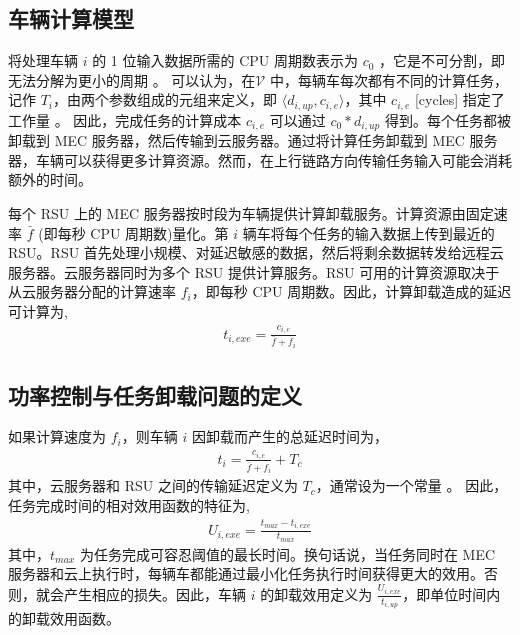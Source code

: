 \subsection{车辆计算模型}\label{section3-2-2}
将处理车辆 $i$ 的 1 位输入数据所需的 CPU 周期数表示为 $c_0$ ，它是不可分割，即无法分解为更小的周期 \supercite{Zhang2017,Saleem2021}。
可以认为，在$ \mathcal{V}$ 中，每辆车每次都有不同的计算任务，记作 $T_i$，由两个参数组成的元组来定义，即 $\langle d_{i,up}, c_{i,e}\rangle$，其中 $c_{i,e}$ [cycles] 指定了工作量 \supercite{Tran2019}。 因此，完成任务的计算成本 $c_{i,e}$ 可以通过 $c_{0}*d_{i,up}$ 得到。每个任务都被卸载到 MEC 服务器，然后传输到云服务器。通过将计算任务卸载到 MEC 服务器，车辆可以获得更多计算资源。然而，在上行链路方向传输任务输入可能会消耗额外的时间。

每个 RSU 上的 MEC 服务器按时段为车辆提供计算卸载服务。计算资源由固定速率 $\bar{f}$ (即每秒 CPU 周期数)量化。第 $i$ 辆车将每个任务的输入数据上传到最近的 RSU。RSU 首先处理小规模、对延迟敏感的数据，然后将剩余数据转发给远程云服务器。{云服务器同时为多个 RSU 提供计算服务。RSU 可用的计算资源取决于从云服务器分配的计算速率 $f_i$，}即每秒 CPU 周期数。因此，计算卸载造成的延迟可计算为,
\begin{eqnarray}\label{E8}
t_{i,exe}=\frac{c_{i,e}}{\bar{f}+f_i}
\end{eqnarray}
\subsection{功率控制与任务卸载问题的定义}\label{section3-2-3}

如果计算速度为 $f_i$，则车辆 $i$ 因卸载而产生的总延迟时间为，
\begin{eqnarray}\label{E9}
 t_i=\frac{c_{i,e}}{\bar{f}+f_i}+T_c
\end{eqnarray}
其中，云服务器和 RSU 之间的传输延迟定义为 $T_c$，通常设为一个常量 \supercite{Xiao2020}。 因此，任务完成时间的相对效用函数的特征为,
\begin{eqnarray}\label{E10}
U_{i,exe}=\frac{t_{max}-t_{i,exe}}{t_{max}}
\end{eqnarray}
其中，$t_{max}$ 为{任务完成可容忍阈值的最长时间}。换句话说，当任务同时在 MEC 服务器和云上执行时，每辆车都能通过最小化任务执行时间获得更大的效用。否则，就会产生相应的损失。因此，车辆 $i$ 的卸载效用定义为 $\frac{U_{i,exe}}{t_{i,up}}$，即单位时间内的卸载效用函数。

